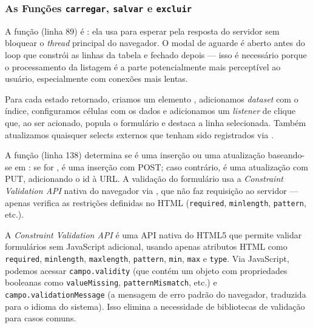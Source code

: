 \subsubsection{As Funções \texttt{carregar}, \texttt{salvar} e \texttt{excluir}}

A função  (linha 89) é : ela usa  para esperar pela resposta do servidor sem bloquear o \textit{thread} principal do navegador. O modal de aguarde é aberto antes do loop que constrói as linhas da tabela e fechado depois --- isso é necessário porque o processamento da listagem é a parte potencialmente mais perceptível ao usuário, especialmente com conexões mais lentas.

Para cada estado retornado, criamos um elemento , adicionamos \textit{dataset} com o índice, configuramos células com os dados e adicionamos um \textit{listener} de clique que, ao ser acionado, popula o formulário e destaca a linha selecionada. Também atualizamos quaisquer selects externos que tenham sido registrados via .

A função  (linha 138) determina se é uma inserção ou uma atualização baseando-se em : se for , é uma inserção com POST; caso contrário, é uma atualização com PUT, adicionando o id à URL. A validação do formulário usa a \textit{Constraint Validation API} nativa do navegador via , que não faz requisição ao servidor --- apenas verifica as restrições definidas no HTML (\texttt{required}, \texttt{minlength}, \texttt{pattern}, etc.).

\begin{saibaMais}
    A \textit{Constraint Validation API} é uma API nativa do HTML5 que permite validar formulários sem JavaScript adicional, usando apenas atributos HTML como \texttt{required}, \texttt{minlength}, \texttt{maxlength}, \texttt{pattern}, \texttt{min}, \texttt{max} e \texttt{type}. Via JavaScript, podemos acessar \texttt{campo.validity} (que contém um objeto com propriedades booleanas como \texttt{valueMissing}, \texttt{patternMismatch}, etc.) e \texttt{campo.validationMessage} (a mensagem de erro padrão do navegador, traduzida para o idioma do sistema). Isso elimina a necessidade de bibliotecas de validação para casos comuns.
\end{saibaMais}

